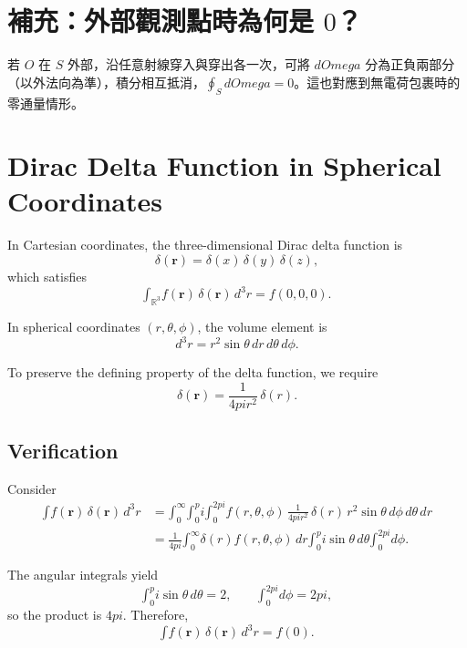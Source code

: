 \documentclass{article}
\def\pi{pi}%
\def\Omega{Omega}%
\def\int{\text{∫}}%
\begin{document}
\section*{補充：外部觀測點時為何是 $0$？}
若 $O$ 在 $S$ 外部，沿任意射線穿入與穿出各一次，可將 $d\Omega$ 分為正負兩部分（以外法向為準），積分相互抵消，\(\displaystyle \oint_S d\Omega=0\)。這也對應到無電荷包裹時的零通量情形。

\section*{Dirac Delta Function in Spherical Coordinates}

In Cartesian coordinates, the three-dimensional Dirac delta function is
\begin{equation}
\delta(\mathbf{r}) = \delta(x)\,\delta(y)\,\delta(z),
\end{equation}
which satisfies
\begin{equation}
\int_{\mathbb{R}^3} f(\mathbf{r}) \, \delta(\mathbf{r}) \, d^3r = f(0,0,0).
\end{equation}

In spherical coordinates $(r,\theta,\phi)$, the volume element is
\begin{equation}
d^3r = r^2 \sin\theta \, dr \, d\theta \, d\phi.
\end{equation}

To preserve the defining property of the delta function, we require
\begin{equation}
\delta(\mathbf{r}) = \frac{1}{4\pi r^2}\,\delta(r).
\end{equation}

\subsection*{Verification}
Consider
\begin{align}
\int f(\mathbf{r}) \, \delta(\mathbf{r}) \, d^3r 
&= \int_0^\infty \int_0^\pi \int_0^{2\pi} 
   f(r,\theta,\phi)\,\frac{1}{4\pi r^2}\,\delta(r)\, 
   r^2 \sin\theta \, d\phi \, d\theta \, dr \\
&= \frac{1}{4\pi} \int_0^\infty \delta(r) f(r,\theta,\phi)\, dr 
   \int_0^\pi \sin\theta \, d\theta 
   \int_0^{2\pi} d\phi.
\end{align}

The angular integrals yield
\[
\int_0^\pi \sin\theta \, d\theta = 2, 
\qquad \int_0^{2\pi} d\phi = 2\pi,
\]
so the product is $4\pi$. Therefore,
\begin{equation}
\int f(\mathbf{r}) \, \delta(\mathbf{r}) \, d^3r = f(0).
\end{equation}
\end{document}
